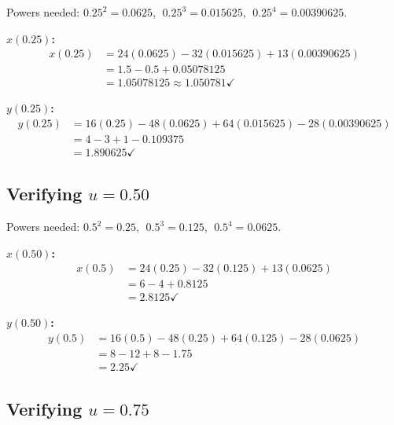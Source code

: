 \documentclass[12pt, a4paper]{article}
\begin{document}
\begin{examplebox}
Powers needed: $0.25^2 = 0.0625$, $\; 0.25^3 = 0.015625$,
$\; 0.25^4 = 0.00390625$.

\medskip
\textbf{$x(0.25)$:}
\begin{align*}
  x(0.25) &= 24(0.0625) - 32(0.015625) + 13(0.00390625) \\
           &= 1.5 - 0.5 + 0.05078125 \\
           &= 1.05078125 \approx 1.050781 \checkmark
\end{align*}

\textbf{$y(0.25)$:}
\begin{align*}
  y(0.25) &= 16(0.25) - 48(0.0625) + 64(0.015625) - 28(0.00390625) \\
           &= 4 - 3 + 1 - 0.109375 \\
           &= 1.890625 \checkmark
\end{align*}
\end{examplebox}

\subsection{Verifying $u = 0.50$}

\begin{examplebox}
Powers needed: $0.5^2 = 0.25$, $\; 0.5^3 = 0.125$,
$\; 0.5^4 = 0.0625$.

\medskip
\textbf{$x(0.50)$:}
\begin{align*}
  x(0.5) &= 24(0.25) - 32(0.125) + 13(0.0625) \\
          &= 6 - 4 + 0.8125 \\
          &= 2.8125 \checkmark
\end{align*}

\textbf{$y(0.50)$:}
\begin{align*}
  y(0.5) &= 16(0.5) - 48(0.25) + 64(0.125) - 28(0.0625) \\
          &= 8 - 12 + 8 - 1.75 \\
          &= 2.25 \checkmark
\end{align*}
\end{examplebox}

\subsection{Verifying $u = 0.75$}
\end{document}
